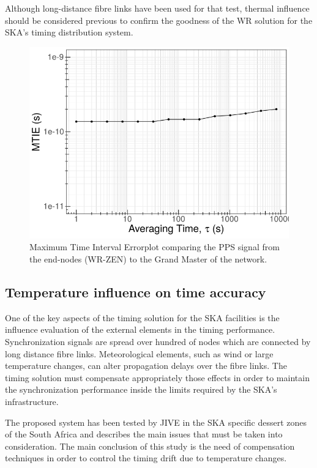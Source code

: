 Although long-distance fibre links have been used for that test, thermal 
influence should be considered previous to confirm the goodness of the 
WR solution for the SKA's timing distribution system. 

\begin{figure}
	\centering
	\includegraphics[width=0.7\linewidth]{img/mtie_exp3}
	\caption[MTIE of the end-nodes in the scalability test.]{Maximum Time 
	Interval Errorplot comparing the PPS signal from the end-nodes (WR-ZEN) to 
	the Grand Master of the network.}
	\label{fig:mtienet}
\end{figure}

\subsection{Temperature influence on time accuracy}
\label{subsec:temp}

One of the key aspects of the timing solution for the SKA facilities is the 
influence evaluation of the external elements in the timing performance. 
Synchronization signals are spread over hundred of nodes which are connected by 
long distance fibre links. Meteorological elements, such as wind or large 
temperature changes, can alter propagation delays over the fibre 
links. The timing solution must compensate appropriately those effects in order 
to maintain the synchronization performance inside the limits required by the 
SKA's infrastructure. 

The proposed system has been tested by JIVE in the SKA specific dessert zones of 
the South Africa and \cite{paul-boven-paper-icalepcs} describes the main issues 
that must be taken into consideration. The main conclusion of this study is the
need of compensation techniques in order to control the timing drift due to
temperature changes.

